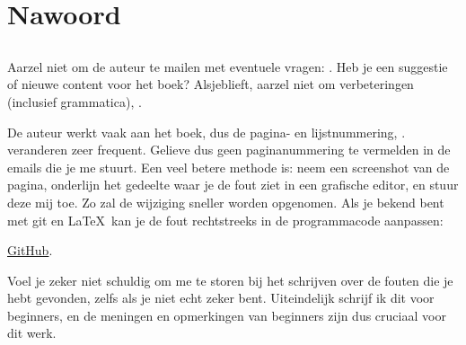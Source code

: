 \part*{Nawoord}

\chapter{\NLph{}}

Aarzel niet om de auteur te mailen met eventuele vragen: \GTT{<\EMAIL>}.
Heb je een suggestie of nieuwe content voor het boek?
Alsjeblieft, aarzel niet om verbeteringen (inclusief grammatica), \etc.

De auteur werkt vaak aan het boek, dus de pagina- en lijstnummering, \etc. veranderen zeer frequent.
Gelieve dus geen paginanummering te vermelden in de emails die je me stuurt.
Een veel betere methode is: neem een screenshot van de pagina, onderlijn het gedeelte waar je de fout ziet in een grafische editor,
en stuur deze mij toe. Zo zal de wijziging sneller worden opgenomen.
Als je bekend bent met git en \LaTeX\, kan je de fout rechtstreeks in de programmacode aanpassen:

\href{http://go.yurichev.com/17089}{GitHub}.

Voel je zeker niet schuldig om me te storen bij het schrijven over de fouten die je hebt gevonden, zelfs als je niet echt zeker bent.
Uiteindelijk schrijf ik dit voor beginners, en de meningen en opmerkingen van beginners zijn dus cruciaal voor dit werk.

